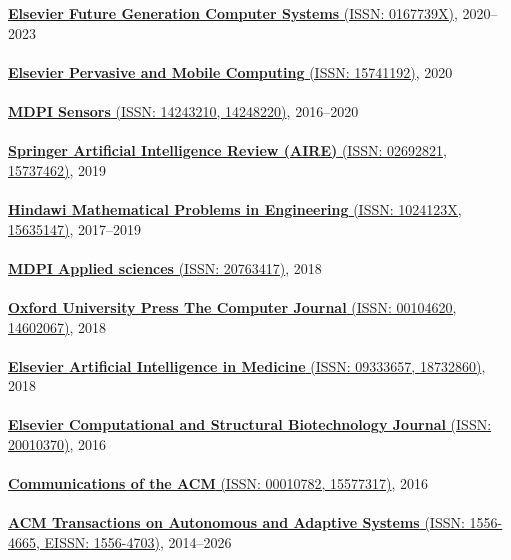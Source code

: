 \href{https://www.sciencedirect.com/journal/future-generation-computer-systems}{\textbf{Elsevier Future Generation Computer Systems} (ISSN: 0167739X)}, 2020--2023
\\ \halfblankline \\
\href{https://www.journals.elsevier.com/pervasive-and-mobile-computing}{\textbf{Elsevier Pervasive and Mobile Computing} (ISSN: 15741192)}, 2020
\\ \halfblankline \\
\href{http://www.mdpi.com/journal/sensors}{\textbf{MDPI Sensors} (ISSN: 14243210, 14248220)}, 2016--2020
\\ \halfblankline \\
\href{https://link.springer.com/journal/10462}{\textbf{Springer Artificial Intelligence Review (AIRE)} (ISSN: 02692821, 15737462)}, 2019
\\ \halfblankline \\
\href{https://www.hindawi.com/journals/mpe/}{\textbf{Hindawi Mathematical Problems in Engineering} (ISSN: 1024123X, 15635147)}, 2017--2019
\\ \halfblankline \\
\href{http://www.mdpi.com/journal/applsci}{\textbf{MDPI Applied sciences} (ISSN: 20763417)}, 2018
\\ \halfblankline \\
\href{https://academic.oup.com/comjnl}{\textbf{Oxford University Press The Computer Journal} (ISSN: 00104620, 14602067)}, 2018
\\ \halfblankline \\
\href{https://www.journals.elsevier.com/artificial-intelligence-in-medicine/}{\textbf{Elsevier Artificial Intelligence in Medicine} (ISSN: 09333657, 18732860)}, 2018
\\ \halfblankline \\
\href{https://www.journals.elsevier.com/computational-and-structural-biotechnology-journal/}{\textbf{Elsevier Computational and Structural Biotechnology Journal} (ISSN: 20010370)}, 2016
\\ \halfblankline \\
\href{http://cacm.acm.org/}{\textbf{Communications of the ACM} (ISSN: 00010782, 15577317)}, 2016
\\ \halfblankline \\
\href{https://dl.acm.org/journal/taas}{\textbf{ACM Transactions on Autonomous and Adaptive Systems} (ISSN: 1556-4665, EISSN: 1556-4703)}, 2014--2026
